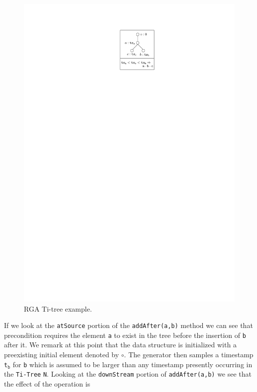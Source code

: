 \begin{figure}
  \centering
  \includegraphics[scale=.9]{figures/simple-ti-tree}
  \caption{RGA Ti-tree example.}
  \label{fig:rga-tree}
\end{figure}
If we look at the \lstinline|atSource| portion of the
\lstinline|addAfter(a,b)| method we can see that precondition requires
the element \lstinline|a| to exist in the tree before the insertion of
\lstinline|b| after it.
%
We remark at this point that the data structure is initialized with a
preexisting initial element denoted by $\circ$.
%
The generator then samples a timestamp \lstinline|t|$_{\mathtt{b}}$
for \lstinline|b| which is assumed to be larger than any
timestamp presently occurring in the \lstinline|Ti-Tree|
\lstinline|N|.
%
Looking at the \lstinline|downStream| portion of
\lstinline|addAfter(a,b)| we see that the effect of the operation is

